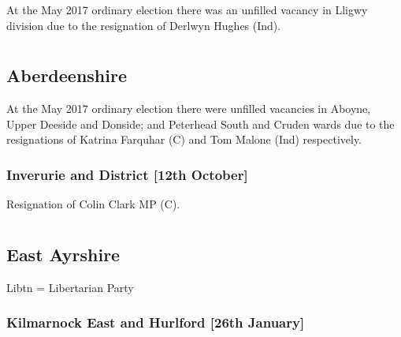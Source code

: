 \documentclass[a4paper,openany]{book}
\begin{document}
\begin{resultsiii}
At the May 2017 ordinary election there was an unfilled vacancy in Lligwy division due to the resignation of Derlwyn Hughes (Ind).

\section[Aberdeen City and Shire]{}

\subsection*{Aberdeenshire}

At the May 2017 ordinary election there were unfilled vacancies in Aboyne, Upper Deeside and Donside; and Peterhead South and Cruden wards due to the resignations of Katrina Farquhar (C) and Tom Malone (Ind) respectively.

\subsubsection*{Inverurie and District \hspace*{\fill}\nolinebreak[1]%
\enspace\hspace*{\fill}
[12th October]}


Resignation of Colin Clark MP (C).

\section[Ayrshire Councils]{}

\subsection*{East Ayrshire}

Libtn = Libertarian Party

\subsubsection*{Kilmarnock East and Hurlford \hspace*{\fill}\nolinebreak[1]%
\enspace\hspace*{\fill}
[26th January]}


\end{resultsiii}
\end{document}
